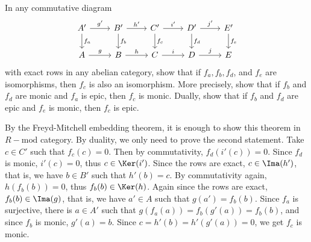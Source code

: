 \begin{exer}[5-lemma] In any commutative diagram
\begin{equation}
\begin{tikzcd}
A'\arrow{r}{g'}\arrow{d}{f_a}&B'\arrow{r}{h'}\arrow{d}{f_b}&C'\arrow{r}{i'}\arrow{d}{f_c}&D'\arrow{r}{j'}\arrow{d}{f_d}&E'\arrow{d}{f_e}\\
A\arrow{r}{g}&B\arrow{r}{h}&C\arrow{r}{i}&D\arrow{r}{j}&E
\end{tikzcd}
\end{equation}
with exact rows in any abelian category, show that if $f_a,f_b,f_d$, and $f_e$ are isomorphisms, then $f_c$ is also an isomorphism. More precisely, show that if $f_b$ and $f_d$ are monic and $f_a$ is epic, then $f_c$ is monic. Dually, show that if $f_b$ and $f_d$ are epic and $f_e$ is monic, then $f_c$ is epic.
\end{exer}
\begin{solution}
By the Freyd-Mitchell embedding theorem, it is enough to show this theorem in $R-\textrm{mod}$ category. By duality, we only need to prove the second statement. Take $c\in C'$ such that $f_c(c)=0$. Then by commutativity, $f_d(i'(c))=0$. Since $f_d$ is monic, $i'(c)=0$, thus $c\in \Ker(i')$. Since the rows are exact, $c\in \Ima(h')$, that is, we have $b\in B'$ such that $h'(b)=c$. By commutativity again, $h(f_b(b))=0$, thus $f_b(b)\in \Ker(h)$. Again since the rows are exact, $f_b(b)\in \Ima(g)$, that is, we have $a'\in A$ such that $g(a')=f_b(b)$. Since $f_a$ is surjective, there is $a\in A'$ such that $g(f_a(a))=f_b(g'(a))=f_b(b)$, and since $f_b$ is monic, $g'(a)=b$. Since $c=h'(b)=h'(g'(a))=0$, we get $f_c$ is monic.
\end{solution}

